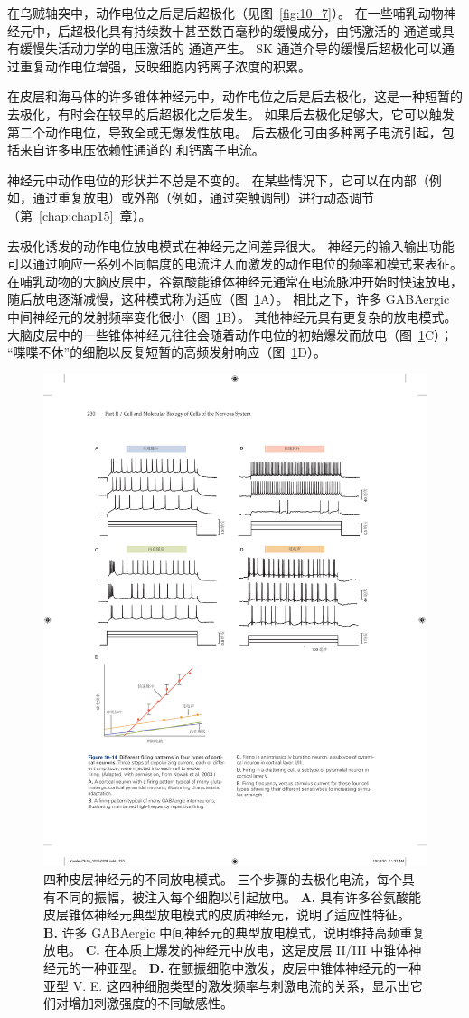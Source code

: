 在乌贼轴突中，动作电位之后是后超极化（见图~\ref{fig:10_7}）。 
在一些哺乳动物神经元中，后超极化具有持续数十甚至数百毫秒的缓慢成分，由钙激活的  通道或具有缓慢失活动力学的电压激活的  通道产生。
SK 通道介导的缓慢后超极化可以通过重复动作电位增强，反映细胞内钙离子浓度的积累。


在皮层和海马体的许多锥体神经元中，动作电位之后是后去极化，这是一种短暂的去极化，有时会在较早的后超极化之后发生。
如果后去极化足够大，它可以触发第二个动作电位，导致全或无爆发性放电。
后去极化可由多种离子电流引起，包括来自许多电压依赖性通道的  和钙离子电流。


神经元中动作电位的形状并不总是不变的。
在某些情况下，它可以在内部（例如，通过重复放电）或外部（例如，通过突触调制）进行动态调节（第~\ref{chap:chap15}~章）。


去极化诱发的动作电位放电模式在神经元之间差异很大。 神经元的输入输出功能可以通过响应一系列不同幅度的电流注入而激发的动作电位的频率和模式来表征。
在哺乳动物的大脑皮层中，谷氨酸能锥体神经元通常在电流脉冲开始时快速放电，随后放电逐渐减慢，这种模式称为适应（图~\ref{fig:10_14}A）。
相比之下，许多 GABAergic 中间神经元的发射频率变化很小（图~\ref{fig:10_14}B）。
其他神经元具有更复杂的放电模式。
大脑皮层中的一些锥体神经元往往会随着动作电位的初始爆发而放电（图~\ref{fig:10_14}C）； “喋喋不休”的细胞以反复短暂的高频发射响应（图~\ref{fig:10_14}D）。


\begin{figure}[htbp]
	\centering
	\includegraphics[width=0.75\linewidth]{chap10/fig_10_14}
	\caption{四种皮层神经元的不同放电模式。 三个步骤的去极化电流，每个具有不同的振幅，被注入每个细胞以引起放电\cite{nowak2003electrophysiological}。
		\textbf{A.} 具有许多谷氨酸能皮层锥体神经元典型放电模式的皮质神经元，说明了适应性特征。
		\textbf{B.} 许多 GABAergic 中间神经元的典型放电模式，说明维持高频重复放电。
		\textbf{C.} 在本质上爆发的神经元中放电，这是皮层 II/III 中锥体神经元的一种亚型。
		\textbf{D.} 在颤振细胞中激发，皮层中锥体神经元的一种亚型 V. E. 这四种细胞类型的激发频率与刺激电流的关系，显示出它们对增加刺激强度的不同敏感性。}
	\label{fig:10_14}
\end{figure}


